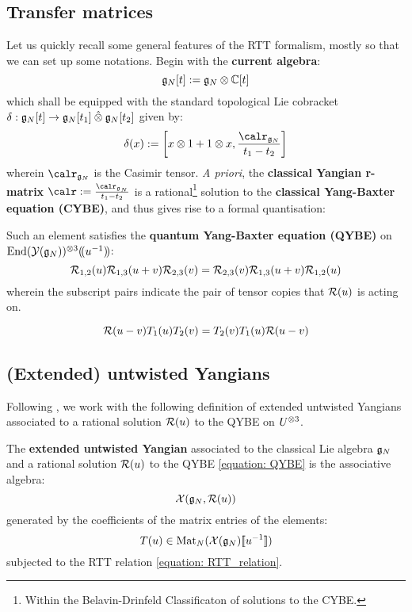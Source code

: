         \subsection{Transfer matrices}
            Let us quickly recall some general features of the RTT formalism, mostly so that we can set up some notations. Begin with the \textbf{current algebra}:
                $$\g_N[t] := \g_N \tensor \bbC[t]$$
            which shall be equipped with the standard topological Lie cobracket $\delta: \g_N[t] \to \g_N[t_1] \hattensor \g_N[t_2]$ given by:
                $$\delta( x ) := \left[ x \tensor 1 + 1 \tensor x, \frac{\calr_{\g_N}}{t_1 - t_2} \right]$$
            wherein $\calr_{\g_N}$ is the Casimir tensor. \textit{A priori}, the \textbf{classical Yangian r-matrix} $\calr := \frac{\calr_{\g_N}}{t_1 - t_2}$ is a rational\footnote{Within the Belavin-Drinfeld Classificaton of solutions to the CYBE.} solution to the \textbf{classical Yang-Baxter equation (CYBE)}, and thus gives rise to a formal quantisation:
                
                
            Such an element satisfies the \textbf{quantum Yang-Baxter equation (QYBE)} on $\End( \calY(\g_N) )^{\tensor 3}(\!(u^{-1})\!)$:
                \begin{equation} \label{equation: QYBE}
                    \mathcal{R}_{1, 2}(u) \mathcal{R}_{1, 3}(u + v) \mathcal{R}_{2, 3}(v) = \mathcal{R}_{2, 3}(v) \mathcal{R}_{1, 3}(u + v) \mathcal{R}_{1, 2}(u)
                \end{equation}
            wherein the subscript pairs indicate the pair of tensor copies that $\mathcal{R}(u)$ is acting on.

            
                \begin{equation} \label{equation: RTT_relation}
                    \mathcal{R}(u - v) T_1(u) T_2(v) = T_2(v) T_1(u) \mathcal{R}(u - v)
                \end{equation}

        \subsection{(Extended) untwisted Yangians}
            Following \cite[Definition 2.1]{guay_regelskis_twisted_yangians_for_symmetric_pairs_of_types_BCD}, we work with the following definition of extended untwisted Yangians associated to a rational solution $\mathcal{R}(u)$ to the QYBE on $U^{\tensor 3}$.
            \begin{definition} \label{def: extended_untwisted_yangians}
                The \textbf{extended untwisted Yangian} associated to the classical Lie algebra $\mathfrak{g}_N$ and a rational solution $\mathcal{R}(u)$ to the QYBE \eqref{equation: QYBE} is the associative algebra:
                    $$\mathcal{X}(\mathfrak{g}_N, \mathcal{R}(u))$$
                generated by the coefficients of the matrix entries of the elements:
                    $$T(u) \in \mathrm{Mat}_N( \mathcal{X}(\mathfrak{g}_N)[\![u^{-1}]\!] )$$
                subjected to the RTT relation \eqref{equation: RTT_relation}.
            \end{definition}

